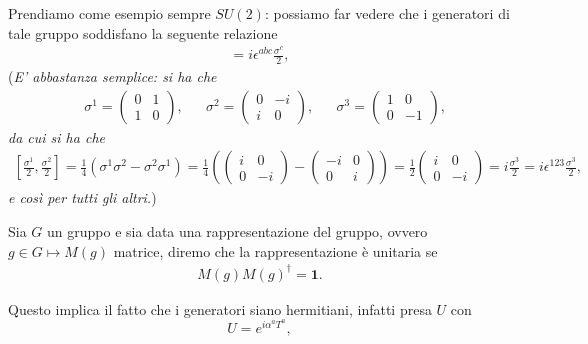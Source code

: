 Prendiamo come esempio sempre $SU(2)$: possiamo far vedere che i generatori di tale gruppo soddisfano la seguente relazione
\begin{align}
    [\frac{\sigma^a}{2}, \frac{\sigma^b}{2}] = i \epsilon^{abc} \frac{\sigma^c}{2},
\end{align}
(\emph{E' abbastanza semplice: si ha che
\begin{align}
    &\sigma^1 = \begin{pmatrix}
        0 & 1 \\
        1 & 0
    \end{pmatrix}, & &\sigma^2 = \begin{pmatrix}
        0 & -i \\
        i & 0
    \end{pmatrix}, & &\sigma^3 = \begin{pmatrix}
        1 & 0 \\
        0 & -1
    \end{pmatrix},
\end{align}
da cui si ha che
\begin{align}
    \left[ \frac{\sigma^1}{2}, \frac{\sigma^2}{2} \right] = \frac{1}{4} \left(\sigma^1 \sigma^2 - \sigma^2 \sigma^1 \right) = \frac{1}{4} \left(\begin{pmatrix}
        i & 0 \\
        0 & -i
    \end{pmatrix} - \begin{pmatrix}
        -i & 0 \\
        0 & i
    \end{pmatrix} \right) = \frac{1}{2} \begin{pmatrix}
        i & 0 \\
        0 & -i
    \end{pmatrix} = i \frac{\sigma^3}{2} = i \epsilon^{123} \frac{\sigma^3}{2}, 
\end{align}
e così per tutti gli altri.})
\begin{definition}
    Sia $G$ un gruppo e sia data una rappresentazione del gruppo, ovvero $g \in G \mapsto M(g)$ matrice, diremo che la rappresentazione è unitaria se
    \begin{align}
        M(g)M(g)^\dagger = \mathbf{1}.
    \end{align}
\end{definition}
Questo implica il fatto che i generatori siano hermitiani, infatti presa $U$ con
\begin{equation}
    U = e^{i \alpha^a T^a},
\end{equation}
